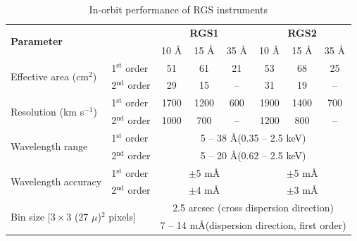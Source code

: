 			
		\begin{table}[!htb]
			\centering
			\caption{In-orbit performance of RGS instruments}
			\label{xmm-rgs-performance}
			\begin{tabular}{l|l|ccc|ccc}
				\hline
				\multicolumn{2}{l|}{\multirow{2}{*}{\textbf{Parameter}}} & \multicolumn{3}{c|}{\textbf{RGS1}} & \multicolumn{3}{c}{\textbf{RGS2}} \\ \cline{3-8}
				\multicolumn{2}{l|}{} & {10 \AA} & {15 \AA} & {35 \AA} & {10 \AA} & {15 \AA} & {35 \AA} \\ \hline
				\multirow{2}{*}{Effective area (cm$^2$)} & {1$^\text{st}$ order} & {51} & {61} & {21} & {53} & {68} & {25} \\ %
														 & {2$^\text{nd}$ order} & {29} & {15} & {--} & {31} & {19} & {--} \\ \hline
				\multirow{2}{*}{Resolution (km s$^{-1}$)}& {1$^\text{st}$ order} & {1700} & {1200} & {600} & {1900} & {1400} & {700} \\ %
														 & {2$^\text{nd}$ order} & {1000} & {700} & {--} & {1200} & {800} & {--} \\ \hline
				\multirow{2}{*}{Wavelength range} & {1$^\text{st}$ order} & \multicolumn{6}{c}{5 -- 38 \AA (0.35 -- 2.5 keV)} \\ %
												   & {2$^\text{nd}$ order} & \multicolumn{6}{c}{5 -- 20 \AA (0.62 -- 2.5 keV)} \\ \hline
				\multirow{2}{*}{Wavelength accuracy} & {1$^\text{st}$ order} & \multicolumn{3}{c}{$\pm$5 m\AA} & \multicolumn{3}{c}{$\pm$5 m\AA} \\ %
                                                  	  & {2$^\text{nd}$ order} & \multicolumn{3}{c}{$\pm$4 m\AA} & \multicolumn{3}{c}{$\pm$3 m\AA} \\ \hline
				\multicolumn{2}{l|}{\multirow{2}{*}{Bin size {[}$3\times 3$ (27 $\mu$)$^2$ pixels{]}}} & \multicolumn{6}{c}{2.5 arcsec (cross dispersion direction)} \\ %
				\multicolumn{2}{l|}{} & \multicolumn{6}{c}{7 -- 14 m\AA (dispersion direction, first order)} \\ \hline
			\end{tabular}
		\end{table}
		
